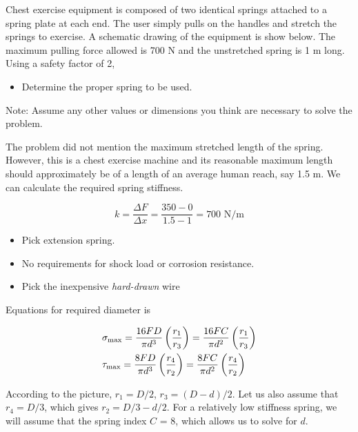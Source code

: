 \documentclass[a4paper,openany,12pt]{book}
\begin{document}
{{Chest exercise equipment is composed of two identical springs attached
to a spring plate at each end. The user simply pulls on the handles and
stretch the springs to exercise. A schematic drawing of the equipment is
show below. The maximum pulling force allowed is 700 N and the
unstretched spring is 1 m long. Using a safety factor of 2,

\begin{itemize}
\item Determine the proper spring to be used.
\end{itemize}

Note: Assume any other values or dimensions you think are necessary to
solve the problem.

The problem did not mention the maximum stretched length of the spring.
However, this is a chest exercise machine and its reasonable maximum
length should approximately be of a length of an average human reach,
say 1.5 m. We can calculate the required spring stiffness.

$$k = \frac{\Delta F}{\Delta x} = \frac{350 - 0}{1.5 - 1} = 700\text{ N/m}$$

\begin{itemize}
\item Pick extension spring.

\item No requirements for shock load or corrosion resistance.

\item Pick the inexpensive \emph{hard-drawn} wire
\end{itemize}

Equations for required diameter is

$$\begin{gathered}
  \sigma_{\max} = \frac{16FD}{\pi d^3}\left( \frac{r_1}{r_3} \right) = \frac{16FC}{\pi d^2}\left( \frac{r_1}{r_3} \right) \hfill \\
  \tau _{\max} = \frac{8FD}{\pi d^3}\left( \frac{r_4}{r_2} \right) = \frac{8FC}{\pi d^2}\left( \frac{r_4}{r_2} \right) \hfill \\ 
\end{gathered}$$


According to the picture, \(r_1 = D / 2\), \(r_3 = (D - d) / 2\). Let us
also assume that \(r_4 = D / 3\), which gives \(r_2 = D / 3 - d / 2\). For a
relatively low stiffness spring, we will assume that the spring index
\(C\) = 8, which allows us to solve for \(d\).

}}
\end{document}

